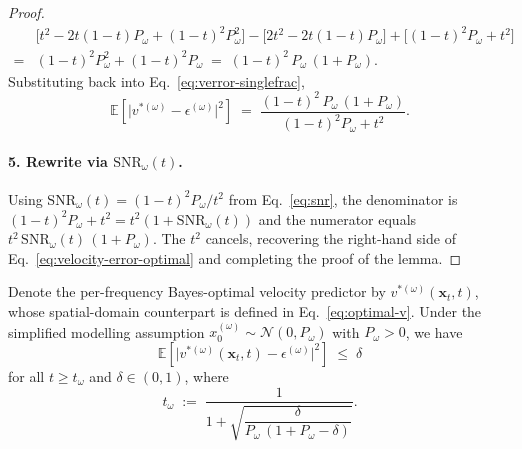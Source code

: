 \begin{proof}
\begin{align}
  & \bigl[t^2 - 2t(1-t) P_\omega + (1-t)^2 P_\omega^2\bigr]
    - \bigl[2t^2 - 2t(1-t) P_\omega\bigr]
    + \bigl[(1-t)^2 P_\omega + t^2\bigr] \nonumber\\
  ={}& (1-t)^2 P_\omega^2 + (1-t)^2 P_\omega
    \;=\; (1-t)^2\,P_\omega\,(1 + P_\omega).
\end{align}
Substituting back into Eq.~\eqref{eq:verror-singlefrac},
\begin{equation}
  \mathbb{E}\!\left[\bigl|v^{*(\omega)} - \epsilon^{(\omega)}\bigr|^2\right]
  \;=\; \frac{(1-t)^2\,P_\omega\,(1 + P_\omega)}{(1-t)^2 P_\omega + t^2}.
\end{equation}

\paragraph{5. Rewrite via $\mathrm{SNR}_\omega(t)$.} Using $\mathrm{SNR}_\omega(t) = (1-t)^2 P_\omega / t^2$ from Eq.~\eqref{eq:snr}, the denominator is $(1-t)^2 P_\omega + t^2 = t^2(1 + \mathrm{SNR}_\omega(t))$ and the numerator equals $t^2\,\mathrm{SNR}_\omega(t)\,(1 + P_\omega)$. The $t^2$ cancels, recovering the right-hand side of Eq.~\eqref{eq:velocity-error-optimal} and completing the proof of the lemma.

\end{proof}

\begin{proposition} Denote the per-frequency Bayes-optimal velocity predictor by $v^{*(\omega)}(\mathbf{x}_t, t)$, whose spatial-domain counterpart is defined in Eq.~\eqref{eq:optimal-v}. Under the simplified modelling assumption $x_0^{(\omega)} \sim \mathcal{N}(0, P_\omega)$ with $P_\omega > 0$, we have
\begin{equation}
  \mathbb{E}\!\left[\bigl|v^{*(\omega)}(\mathbf{x}_t, t) - \epsilon^{(\omega)}\bigr|^2\right] \;\le\; \delta
  \label{eq:noise-dominated-appendix}
\end{equation}
for all $t \ge t_\omega$ and $\delta\in(0, 1)$, where
\begin{equation}
  t_\omega \;:=\; \frac{1}{1 + \sqrt{\dfrac{\delta}{P_\omega\,(1 + P_\omega - \delta)}}}.
  \label{eq:activation-appendix}
\end{equation}
\end{proposition}

